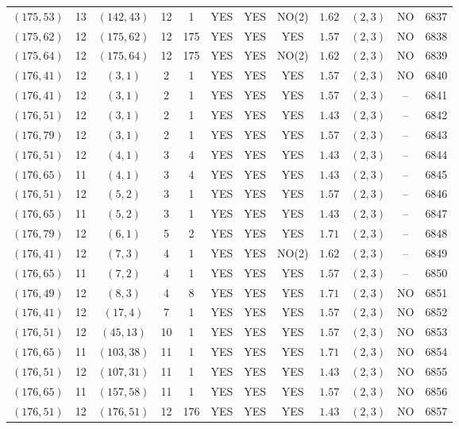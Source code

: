 \begin{longtable}{|c|c|c|c|c|c|c|c|c|c|c|c|}
$(175,53)$ & 13 & $(142,43)$ & 12 & 1 & YES & YES & NO(2) & $1.62$ & $(2,3)$ & NO & 6837\\
$(175,62)$ & 12 & $(175,62)$ & 12 & 175 & YES & YES & YES & $1.57$ & $(2,3)$ & NO & 6838\\
$(175,64)$ & 12 & $(175,64)$ & 12 & 175 & YES & YES & NO(2) & $1.62$ & $(2,3)$ & NO & 6839\\
$(176,41)$ & 12 & $(3,1)$ & 2 & 1 & YES & YES & YES & $1.57$ & $(2,3)$ & NO & 6840\\
$(176,41)$ & 12 & $(3,1)$ & 2 & 1 & YES & YES & YES & $1.57$ & $(2,3)$ & -- & 6841\\
$(176,51)$ & 12 & $(3,1)$ & 2 & 1 & YES & YES & YES & $1.43$ & $(2,3)$ & -- & 6842\\
$(176,79)$ & 12 & $(3,1)$ & 2 & 1 & YES & YES & YES & $1.57$ & $(2,3)$ & -- & 6843\\
$(176,51)$ & 12 & $(4,1)$ & 3 & 4 & YES & YES & YES & $1.43$ & $(2,3)$ & -- & 6844\\
$(176,65)$ & 11 & $(4,1)$ & 3 & 4 & YES & YES & YES & $1.43$ & $(2,3)$ & -- & 6845\\
$(176,51)$ & 12 & $(5,2)$ & 3 & 1 & YES & YES & YES & $1.57$ & $(2,3)$ & -- & 6846\\
$(176,65)$ & 11 & $(5,2)$ & 3 & 1 & YES & YES & YES & $1.43$ & $(2,3)$ & -- & 6847\\
$(176,79)$ & 12 & $(6,1)$ & 5 & 2 & YES & YES & YES & $1.71$ & $(2,3)$ & -- & 6848\\
$(176,41)$ & 12 & $(7,3)$ & 4 & 1 & YES & YES & NO(2) & $1.62$ & $(2,3)$ & -- & 6849\\
$(176,65)$ & 11 & $(7,2)$ & 4 & 1 & YES & YES & YES & $1.57$ & $(2,3)$ & -- & 6850\\
$(176,49)$ & 12 & $(8,3)$ & 4 & 8 & YES & YES & YES & $1.71$ & $(2,3)$ & NO & 6851\\
$(176,41)$ & 12 & $(17,4)$ & 7 & 1 & YES & YES & YES & $1.57$ & $(2,3)$ & NO & 6852\\
$(176,51)$ & 12 & $(45,13)$ & 10 & 1 & YES & YES & YES & $1.57$ & $(2,3)$ & NO & 6853\\
$(176,65)$ & 11 & $(103,38)$ & 11 & 1 & YES & YES & YES & $1.71$ & $(2,3)$ & NO & 6854\\
$(176,51)$ & 12 & $(107,31)$ & 11 & 1 & YES & YES & YES & $1.43$ & $(2,3)$ & NO & 6855\\
$(176,65)$ & 11 & $(157,58)$ & 11 & 1 & YES & YES & YES & $1.57$ & $(2,3)$ & NO & 6856\\
$(176,51)$ & 12 & $(176,51)$ & 12 & 176 & YES & YES & YES & $1.43$ & $(2,3)$ & NO & 6857\\

\end{longtable}
